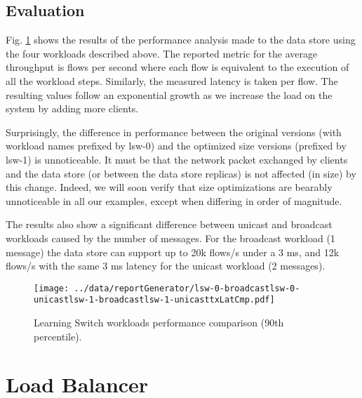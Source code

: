 \subsection{Evaluation}
Fig. \ref{fig:lsw:comparison} shows the results of the performance analysis made to the data store using the four workloads described above. 
The reported metric for the average throughput  is flows per second where each flow is equivalent to the execution of all the workload steps. 
Similarly, the measured latency is taken per flow. 
The resulting values follow an exponential growth as we increase the load on the system by adding more clients. 

Surprisingly, the difference in performance between the original versions (with workload names prefixed by lsw-0) and the optimized size versions (prefixed by lsw-1) is unnoticeable. 
It must be that the network packet exchanged by clients and the data store (or between the data store replicas) is  not affected (in size) by this change. 
Indeed, we will soon verify that size optimizations are bearably unnoticeable in all our examples, except when differing in order of magnitude. 

The results also show a significant difference between unicast and broadcast workloads caused by the number of messages. 
For the broadcast workload (1 message) the data store can support up to 20k flows/s under a 3 ms, and 
12k flows/s with the same 3 ms latency  for the unicast workload (2 messages). 

\begin{figure}[ht]
\centering
\texttt{[image: ../data/reportGenerator/lsw-0-broadcastlsw-0-unicastlsw-1-broadcastlsw-1-unicasttxLatCmp.pdf]}
\caption[Learning Switch workloads performance comparison]{Learning
  Switch workloads performance comparison (90th percentile). }
\label{fig:lsw:comparison}
\end{figure}


\section{Load Balancer}
\label{sec:feasibility:lb}
\glsresetall

